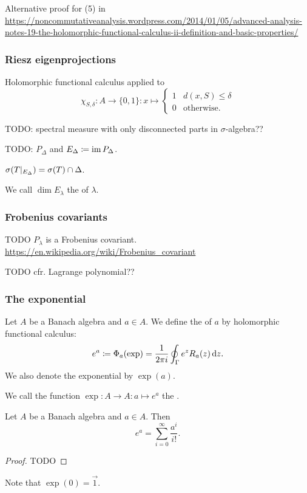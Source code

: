 Alternative proof for (5) in \url{https://noncommutativeanalysis.wordpress.com/2014/01/05/advanced-analysis-notes-19-the-holomorphic-functional-calculus-ii-definition-and-basic-properties/}

\subsubsection{Riesz eigenprojections}
Holomorphic functional calculus applied to
\[ \chi_{S,\delta}: A\to \{0,1\}: x\mapsto \begin{cases}
1 & d(x,S) \leq \delta \\
0 & \text{otherwise}.
\end{cases} \]

TODO: spectral measure with only disconnected parts in $\sigma$-algebra??

TODO: $P_\Delta$ and $E_\Delta \coloneqq \operatorname{im} P_\Delta$.

\begin{lemma}
$\sigma(T|_{E_\Delta}) = \sigma(T)\cap\Delta$.
\end{lemma}

\begin{definition}
We call $\dim E_\lambda$ the  of $\lambda$.
\end{definition}

\subsubsection{Frobenius covariants}
TODO $P_\lambda$ is a Frobenius covariant. \url{https://en.wikipedia.org/wiki/Frobenius_covariant}

TODO cfr. Lagrange polynomial??

\subsubsection{The exponential}
\begin{definition}
Let $A$ be a Banach algebra and $a\in A$. We define the  of $a$ by holomorphic functional calculus:
\[ e^a \coloneqq \Phi_a(\exp) = \frac{1}{2\pi i}\oint_\Gamma e^zR_a(z)\operatorname{d \!}{z}. \]
We also denote the exponential by $\exp(a)$.

We call the function $\exp: A\to A: a\mapsto e^a$ the .
\end{definition}

\begin{proposition}
Let $A$ be a Banach algebra and $a\in A$. Then
\[ e^a = \sum_{i=0}^\infty \frac{a^i}{i!}. \]
\end{proposition}
\begin{proof}
TODO
\end{proof}
Note that $\exp(0) = \vec{1}$.

